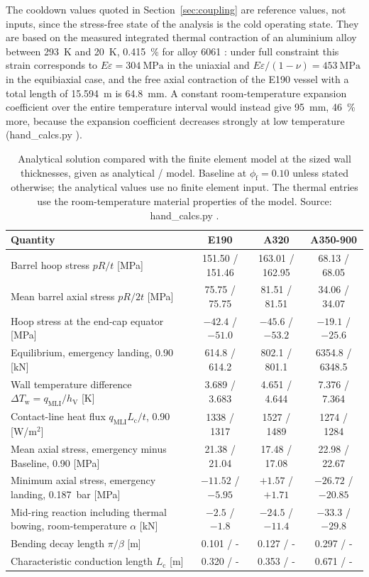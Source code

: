 The cooldown values quoted in Section~\ref{sec:coupling} are reference values, not inputs, since the stress-free state of the analysis is the cold operating state. They are based on the measured integrated thermal contraction of an aluminium alloy between \SI{293}{\kelvin} and \SI{20}{\kelvin}, \SI{0.415}{\percent} for alloy 6061 \cite{ref34}: under full constraint this strain corresponds to $E\varepsilon = \SI{304}{\mega\pascal}$ in the uniaxial and $E\varepsilon/(1-\nu) = \SI{453}{\mega\pascal}$ in the equibiaxial case, and the free axial contraction of the E190 vessel with a total length of \SI{15.594}{\metre} is \SI{64.8}{\milli\metre}. A constant room-temperature expansion coefficient over the entire temperature interval would instead give \SI{95}{\milli\metre}, \SI{46}{\percent} more, because the expansion coefficient decreases strongly at low temperature (hand\_calcs.py \cite{ref32}).

\begin{table}[!htbp]
\centering
\caption[Hand calculation against the finite element model]{Analytical solution compared with the finite element model at the sized wall thicknesses, given as analytical / model. Baseline at $\phi_{\mathrm{f}} = 0.10$ unless stated otherwise; the analytical values use no finite element input. The thermal entries use the room-temperature material properties of the model. Source: hand\_calcs.py \cite{ref32}.}
\label{tab:app_agreement}
\footnotesize
\setlength{\tabcolsep}{4pt}
\begin{tabular}{@{}lccc@{}}
\toprule
Quantity & E190 & A320 & A350-900 \\
\midrule
Barrel hoop stress $pR/t$ [MPa] & 151.50 / 151.46 & 163.01 / 162.95 & 68.13 / 68.05 \\
Mean barrel axial stress $pR/2t$ [MPa] & 75.75 / 75.75 & 81.51 / 81.51 & 34.06 / 34.07 \\
Hoop stress at the end-cap equator [MPa] & $-42.4$ / $-51.0$ & $-45.6$ / $-53.2$ & $-19.1$ / $-25.6$ \\
Equilibrium, emergency landing, 0.90 [kN] & 614.8 / 614.2 & 802.1 / 801.1 & 6354.8 / 6348.5 \\
Wall temperature difference $\Delta T_{\mathrm{w}} = q_{\mathrm{MLI}}/h_{\mathrm{V}}$ [K] & 3.689 / 3.683 & 4.651 / 4.644 & 7.376 / 7.364 \\
Contact-line heat flux $q_{\mathrm{MLI}}L_{\mathrm{c}}/t$, 0.90 [W/m$^2$] & 1338 / 1317 & 1527 / 1489 & 1274 / 1284 \\
Mean axial stress, emergency minus Baseline, 0.90 [MPa] & 21.38 / 21.04 & 17.48 / 17.08 & 22.98 / 22.67 \\
Minimum axial stress, emergency landing, \SI{0.187}{\bar} [MPa] & $-11.52$ / $-5.95$ & $+1.57$ / $+1.71$ & $-26.72$ / $-20.85$ \\
Mid-ring reaction including thermal bowing, room-temperature $\alpha$ [kN] & $-2.5$ / $-1.8$ & $-24.5$ / $-11.4$ & $-33.3$ / $-29.8$ \\
Bending decay length $\pi/\beta$ [m] & 0.101 / - & 0.127 / - & 0.297 / - \\
Characteristic conduction length $L_{\mathrm{c}}$ [m] & 0.320 / - & 0.353 / - & 0.671 / - \\
\bottomrule
\end{tabular}
\end{table}
